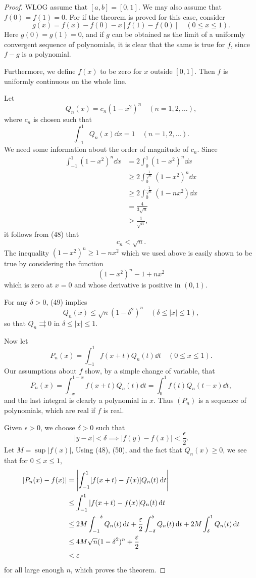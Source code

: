 \begin{proof}
WLOG assume that $[a,b]=[0,1]$. We may also assume that $f(0)=f(1)=0$. For if the theorem is proved for this case, consider
\[g(x)=f(x)-f(0)-x[f(1)-f(0)]\quad(0\le x\le 1).\]
Here $g(0)=g(1)=0$, and if $g$ can be obtained as the limit of a uniformly convergent sequence of polynomials, it is clear that the same is true for $f$, since $f-g$ is a polynomial.

Furthermore, we define $f(x)$ to be zero for $x$ outside $[0,1]$. Then $f$ is uniformly continuous on the whole line.

Let
\[Q_n(x)=c_n(1-x^2)^n\quad(n=1,2,\dots),\]
where $c_n$ is chosen such that
\[\int_{-1}^{1}Q_n(x)\dd{x}=1\quad(n=1,2,\dots).\]
We need some information about the order of magnitude of $c_n$. Since 
\begin{align*}
\int_{-1}^{1}(1-x^2)^n\dd{x}
&=2\int_{0}^{1}(1-x^2)^n\dd{x}\\
&\ge 2\int_{0}^{\frac{1}{\sqrt{n}}}(1-x^2)^n\dd{x}\\
&\ge 2\int_{0}^{\frac{1}{\sqrt{n}}}(1-nx^2)\dd{x}\\
&=\frac{4}{3\sqrt{n}}\\
&>\frac{1}{\sqrt{n}},
\end{align*}
it follows from (48) that 
\[c_n<\sqrt{n}.\]
The inequality $(1-x^2)^n\ge 1-nx^2$ which we used above is easily shown to be true by considering the function
\[(1-x^2)^n-1+nx^2\]
which is zero at $x=0$ and whose derivative is positive in $(0,1)$.

For any $\delta>0$, (49) implies
\[Q_n(x)\le\sqrt{n}(1-\delta^2)^n\quad(\delta\le|x|\le1),\]
so that $Q_n\rightrightarrows 0$ in $\delta\le|x|\le1$.

Now let
\[P_n(x)=\int_{-1}^{1}f(x+t)Q_n(t)\dd{t}\quad(0\le x\le 1).\]
Our assumptions about $f$ show, by a simple change of variable, that
\[P_n(x)=\int_{-x}^{1-x}f(x+t)Q_n(t)\dd{t}=\int_{0}^{1}f(t)Q_n(t-x)\dd{t},\]
and the last integral is clearly a polynomial in $x$. Thus $(P_n)$ is a sequence of polynomials, which are real if $f$ is real.

Given $\epsilon>0$, we choose $\delta>0$ such that
\[|y-x|<\delta\implies|f(y)-f(x)|<\frac{\epsilon}{2}.\]
Let $M=\sup|f(x)|$, Using (48), (50), and the fact that $Q_n(x)\ge0$, we see that for $0\le x\le 1$, 
\begin{align*}
|P_n(x)-f(x)|
&=\left|\int_{-1}^{1}[f(x+t)-f(x)]Q_n(t)\dd{t}\right|\\
&\le\int_{-1}^{1}|f(x+t)-f(x)|Q_n(t)\dd{t}\\
&\le 2M\int_{-1}^{-\delta}Q_n(t)\dd{t}+\frac{\varepsilon}{2}\int_{-\delta}^{\delta}Q_n(t)\dd{t}+2M\int_{\delta}^{1}Q_n(t)\dd{t}\\
&\le 4M\sqrt{n}(1-\delta^2)^n+\frac{\varepsilon}{2}\\
&<\varepsilon
\end{align*}
for all large enough $n$, which proves the theorem. 
\end{proof}

